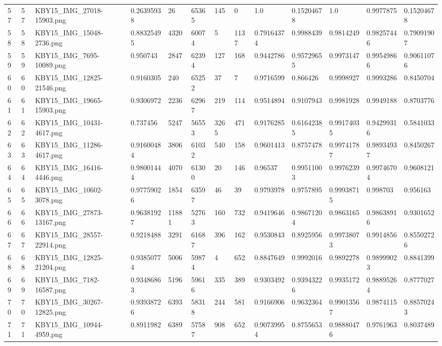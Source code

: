 \documentclass[11pt, a4paper, twoside]{report}
\begin{document}
\begin{longtable}[c]{@{}lllllllllllll@{}}
57 & 57 & KBY15\_IMG\_27018-15903.png & 0.26395938 & 26 & 65365 & 145 & 0 & 1.0 & 0.15204678 & 1.0 & 0.9977875 & 0.15204678 \\
58 & 58 & KBY15\_IMG\_15048-2736.png & 0.88325495 & 4320 & 60074 & 5 & 1137 & 0.79164374 & 0.9988439 & 0.9814249 & 0.98257446 & 0.79091907 \\
59 & 59 & KBY15\_IMG\_7695-10089.png & 0.950743 & 2847 & 62394 & 127 & 168 & 0.9442786 & 0.95729655 & 0.9973147 & 0.99549866 & 0.90611076 \\
60 & 60 & KBY15\_IMG\_12825-21546.png & 0.9160305 & 240 & 65252 & 37 & 7 & 0.9716599 & 0.866426 & 0.9998927 & 0.9993286 & 0.8450704 \\
61 & 61 & KBY15\_IMG\_19665-15903.png & 0.9306972 & 2236 & 62967 & 219 & 114 & 0.9514894 & 0.9107943 & 0.9981928 & 0.9949188 & 0.8703776 \\
62 & 62 & KBY15\_IMG\_10431-4617.png & 0.737456 & 5247 & 56553 & 3265 & 471 & 0.9176285 & 0.61642385 & 0.99174035 & 0.94299316 & 0.5841033 \\
63 & 63 & KBY15\_IMG\_11286-4617.png & 0.91600484 & 3806 & 61032 & 540 & 158 & 0.9601413 & 0.8757478 & 0.99741787 & 0.98934937 & 0.8450267 \\
64 & 64 & KBY15\_IMG\_16416-4446.png & 0.98001444 & 4070 & 61300 & 20 & 146 & 0.96537 & 0.99511003 & 0.9976239 & 0.99746704 & 0.9608121 \\
65 & 65 & KBY15\_IMG\_10602-3078.png & 0.97759026 & 1854 & 63597 & 46 & 39 & 0.9793978 & 0.9757895 & 0.99938715 & 0.998703 & 0.956163 \\
66 & 66 & KBY15\_IMG\_27873-13167.png & 0.96381927 & 11881 & 52763 & 160 & 732 & 0.9419646 & 0.98671204 & 0.9863165 & 0.98638916 & 0.9301652 \\
67 & 67 & KBY15\_IMG\_28557-22914.png & 0.9218488 & 3291 & 61687 & 396 & 162 & 0.9530843 & 0.8925956 & 0.99738073 & 0.9914856 & 0.85502726 \\
68 & 68 & KBY15\_IMG\_12825-21204.png & 0.93850774 & 5006 & 59874 & 4 & 652 & 0.8847649 & 0.9992016 & 0.9892278 & 0.98999023 & 0.8841399 \\
69 & 69 & KBY15\_IMG\_7182-16587.png & 0.93486863 & 5196 & 59616 & 335 & 389 & 0.9303492 & 0.93943226 & 0.9935172 & 0.98895264 & 0.8777027 \\
70 & 70 & KBY15\_IMG\_30267-12825.png & 0.93938726 & 6393 & 58318 & 244 & 581 & 0.9166906 & 0.9632364 & 0.99013567 & 0.9874115 & 0.88570243 \\
71 & 71 & KBY15\_IMG\_10944-4959.png & 0.8911982 & 6389 & 57587 & 908 & 652 & 0.90739954 & 0.8755653 & 0.98880476 & 0.9761963 & 0.8037489 \\

\end{longtable}
\end{document}
